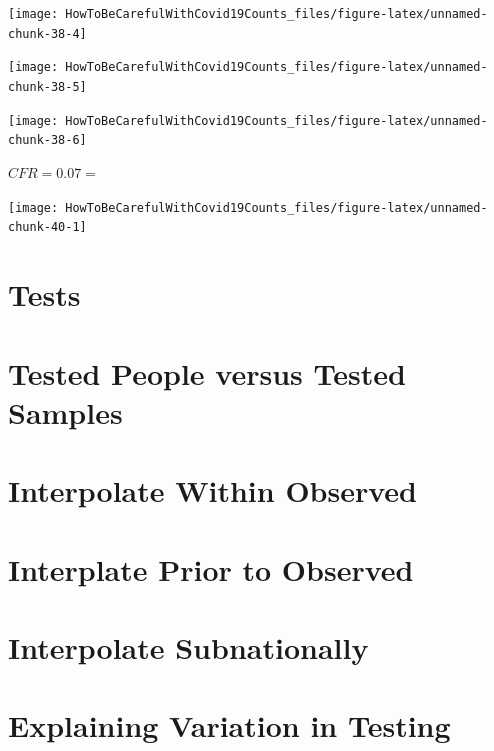 \documentclass[
]{book}
\begin{document}
\begin{center}\texttt{[image: HowToBeCarefulWithCovid19Counts\_files/figure-latex/unnamed-chunk-38-4]} \end{center}

\begin{center}\texttt{[image: HowToBeCarefulWithCovid19Counts\_files/figure-latex/unnamed-chunk-38-5]} \end{center}

\begin{center}\texttt{[image: HowToBeCarefulWithCovid19Counts\_files/figure-latex/unnamed-chunk-38-6]} \end{center}

\(CFR=0.07 = \frac{}{}\)

\begin{center}\texttt{[image: HowToBeCarefulWithCovid19Counts\_files/figure-latex/unnamed-chunk-40-1]} \end{center}

\hypertarget{tests}{%
\section{Tests}\label{tests}}

\hypertarget{tested-people-versus-tested-samples}{%
\section{Tested People versus Tested Samples}\label{tested-people-versus-tested-samples}}

\hypertarget{interpolate-within-observed}{%
\section{Interpolate Within Observed}\label{interpolate-within-observed}}

\hypertarget{interplate-prior-to-observed}{%
\section{Interplate Prior to Observed}\label{interplate-prior-to-observed}}

\hypertarget{interpolate-subnationally}{%
\section{Interpolate Subnationally}\label{interpolate-subnationally}}

\hypertarget{explaining-variation-in-testing}{%
\section{Explaining Variation in Testing}\label{explaining-variation-in-testing}}
\end{document}
